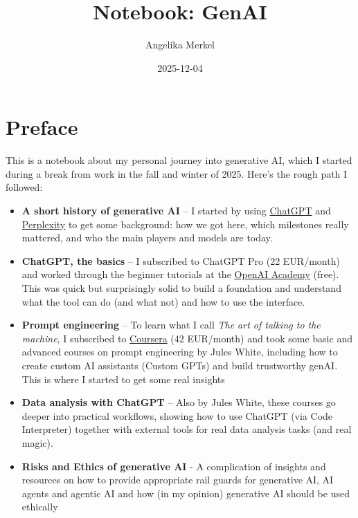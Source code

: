 \documentclass[
  letterpaper,
  DIV=11,
  numbers=noendperiod]{scrreprt}
\title{Notebook: GenAI}
\author{Angelika Merkel}
\date{2025-12-04}
\renewcommand*\contentsname{Table of contents}
\newcommand\contentsname{Table of contents}
\begin{document}
\maketitle

\renewcommand*\contentsname{Table of contents}
{
\hypersetup{linkcolor=}
\setcounter{tocdepth}{2}
\tableofcontents
}


\chapter*{Preface}\label{preface}


This is a notebook about my personal journey into generative AI, which I
started during a break from work in the fall and winter of 2025. Here's
the rough path I followed:

\begin{itemize}
\item
  \textbf{A short history of generative AI} -- I started by using
  \href{https://chatgpt.com}{ChatGPT} and
  \href{https://www.perplexity.ai}{Perplexity} to get some background:
  how we got here, which milestones really mattered, and who the main
  players and models are today.
\item
  \textbf{ChatGPT, the basics} -- I subscribed to ChatGPT Pro (22
  EUR/month) and worked through the beginner tutorials at the
  \href{https://academy.openai.com}{OpenAI Academy} (free). This was
  quick but surprisingly solid to build a foundation and understand what
  the tool can do (and what not) and how to use the interface.
\item
  \textbf{Prompt engineering} -- To learn what I call \emph{The art of
  talking to the machine}, I subscribed to
  \href{https://www.coursera.org}{Coursera} (42 EUR/month) and took some
  basic and advanced courses on prompt engineering by Jules White,
  including how to create custom AI assistants (Custom GPTs) and build
  trustworthy genAI. This is where I started to get some real insights
\item
  \textbf{Data analysis with ChatGPT} -- Also by Jules White, these
  courses go deeper into practical workflows, showing how to use ChatGPT
  (via Code Interpreter) together with external tools for real data
  analysis tasks (and real magic).
\item
  \textbf{Risks and Ethics of generative AI} - A complication of
  insights and resources on how to provide appropriate rail guards for
  generative AI, AI agents and agentic AI and how (in my opinion)
  generative AI should be used ethically
\end{itemize}
\end{document}
